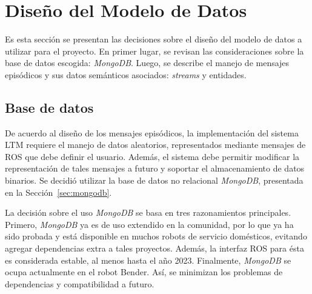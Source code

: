
\section{Diseño del Modelo de Datos}\label{sec:data_model_design}

Es esta sección se presentan las decisiones sobre el diseño del modelo de datos a utilizar para el proyecto. En primer lugar, se revisan las consideraciones sobre la base de datos escogida: \textit{MongoDB}. Luego, se describe el manejo de mensajes episódicos y sus datos semánticos asociados: \textit{streams} y entidades.


\subsection{Base de datos}

De acuerdo al diseño de los mensajes episódicos, la implementación del sistema LTM requiere el manejo de datos aleatorios, representados mediante mensajes de ROS que debe definir el usuario. Además, el sistema debe permitir modificar la representación de tales mensajes a futuro y soportar el almacenamiento de datos binarios. Se decidió utilizar la base de datos no relacional \textit{MongoDB}, presentada en la Sección~\ref{sec:mongodb}. 

La decisión sobre el uso \textit{MongoDB} se basa en tres razonamientos principales. Primero, \textit{MongoDB} ya es de uso extendido en la comunidad, por lo que ya ha sido probada y está disponible en muchos robots de servicio domésticos, evitando agregar dependencias extra a tales proyectos. Además, la interfaz ROS para ésta es considerada estable, al menos hasta el año 2023.  Finalmente, \textit{MongoDB} se ocupa actualmente en el robot Bender. Así, se minimizan los problemas de dependencias y compatibilidad a futuro.


